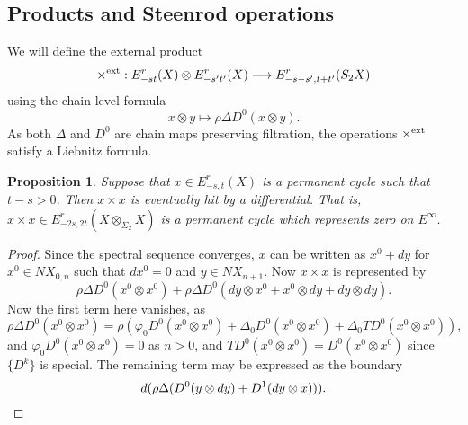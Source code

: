 \documentclass[11pt]{amsart}
\theoremstyle{plain}
\newtheorem{prop}[thm]{Proposition}
\theoremstyle{definition}
\let\phi\varphi
\renewcommand{\to}{\longrightarrow}
\theoremstyle{plain}
\begin{document}
\subsection{Products and Steenrod operations}
We will define the external product
\[\times^\textup{ext}:E^r_{-st}(X)\otimes E^r_{-s't'}(X)\to E^r_{-s-s',t+t'}(S_2X)\]
using the chain-level formula
\[x\otimes y\mapsto\rho\Delta D^0(x\otimes y).\]
As both $\Delta$ and $D^0$ are chain maps preserving filtration, the operations $\times^\textup{ext}$ satisfy a Liebnitz formula.
\begin{prop}
Suppose that $x\in E^r_{-s,t}(X)$ is a permanent cycle such that $t-s>0$. Then $x\times x$ is eventually hit by a differential. That is, $x\times x\in E^r_{-2s,2t}(X\otimes_{\Sigma_2}X)$ is a permanent cycle which represents zero on $E^\infty$.
\end{prop}
\begin{proof}
Since the spectral sequence converges, $x$ can be written as $x^0+dy$ for $x^0\in NX_{0,n}$ such that $dx^0=0$ and $y\in NX_{n+1}$. Now $x\times x$ is represented by
\[\rho\Delta D^0(x^0\otimes x^0)+\rho\Delta D^0(dy\otimes x^0+x^0\otimes dy+dy\otimes dy).\]
Now the first term here vanishes, as
\[\rho\Delta D^0(x^0\otimes x^0)=\rho(\phi_0 D^0(x^0\otimes x^0)+\Delta_0 D^0(x^0\otimes x^0)+\Delta_0 TD^0(x^0\otimes x^0)),\]
and $\phi_0D^0(x^0\otimes x^0)=0$ as $n>0$, and $TD^0(x^0\otimes x^0)=D^0(x^0\otimes x^0)$ since $\{D^k\}$ is special. The remaining term may be expressed as the boundary
\[d(\rho\Delta(D^0(y\otimes dy)+D^1(dy\otimes x))).\qedhere\]
\end{proof}
\end{document}
